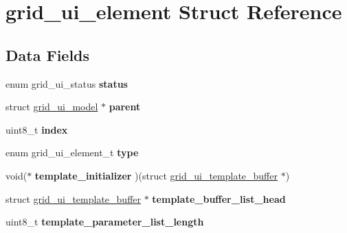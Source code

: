 \hypertarget{structgrid__ui__element}{\section{grid\-\_\-ui\-\_\-element Struct Reference}
\label{structgrid__ui__element}
}
\subsection*{Data Fields}
\begin{DoxyCompactItemize}
\item 
\hypertarget{structgrid__ui__element_a0f40ca67187e9da80b2c9359cd7c8c9e}{enum grid\-\_\-ui\-\_\-status {\bfseries status}}\label{structgrid__ui__element_a0f40ca67187e9da80b2c9359cd7c8c9e}

\item 
\hypertarget{structgrid__ui__element_a01a18a62f33cef4e641ef240c3f195ec}{struct \hyperlink{structgrid__ui__model}{grid\-\_\-ui\-\_\-model} $\ast$ {\bfseries parent}}\label{structgrid__ui__element_a01a18a62f33cef4e641ef240c3f195ec}

\item 
\hypertarget{structgrid__ui__element_a15f016607ab24eb946e7d13d3fba6b66}{uint8\-\_\-t {\bfseries index}}\label{structgrid__ui__element_a15f016607ab24eb946e7d13d3fba6b66}

\item 
\hypertarget{structgrid__ui__element_a210d808ccb7f78f631127f3003b69d5d}{enum grid\-\_\-ui\-\_\-element\-\_\-t {\bfseries type}}\label{structgrid__ui__element_a210d808ccb7f78f631127f3003b69d5d}

\item 
\hypertarget{structgrid__ui__element_a3dfecc7fc0c83e32e435b3a4feb133a3}{void($\ast$ {\bfseries template\-\_\-initializer} )(struct \hyperlink{structgrid__ui__template__buffer}{grid\-\_\-ui\-\_\-template\-\_\-buffer} $\ast$)}\label{structgrid__ui__element_a3dfecc7fc0c83e32e435b3a4feb133a3}

\item 
\hypertarget{structgrid__ui__element_a20e9965124b656379af5665b9f961788}{struct \hyperlink{structgrid__ui__template__buffer}{grid\-\_\-ui\-\_\-template\-\_\-buffer} $\ast$ {\bfseries template\-\_\-buffer\-\_\-list\-\_\-head}}\label{structgrid__ui__element_a20e9965124b656379af5665b9f961788}

\item 
\hypertarget{structgrid__ui__element_a1e894ed2abd33e89f6eb172969b6ae51}{uint8\-\_\-t {\bfseries template\-\_\-parameter\-\_\-list\-\_\-length}}\label{structgrid__ui__element_a1e894ed2abd33e89f6eb172969b6ae51}


\end{DoxyCompactItemize}
